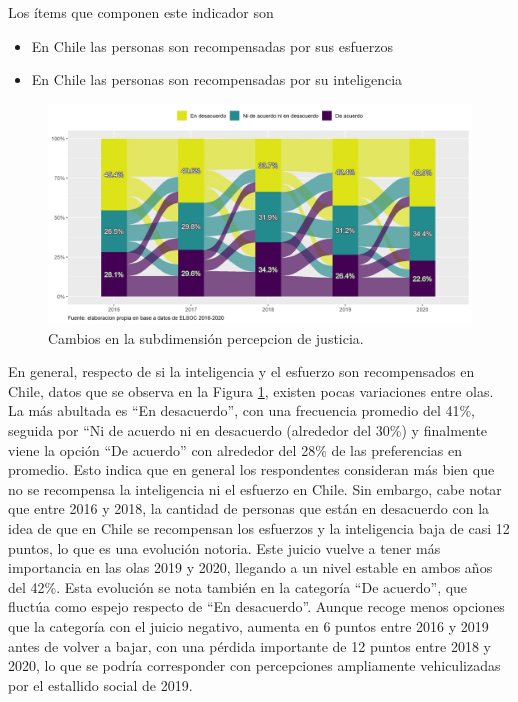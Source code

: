 \documentclass[
  12pt,
]{book}
\begin{document}
Los ítems que componen este indicador son

\begin{itemize}
\item
  En Chile las personas son recompensadas por sus esfuerzos
\item
  En Chile las personas son recompensadas por su inteligencia
\end{itemize}

\begin{figure}[H]

{\centering \includegraphics[width=1\linewidth,height=1\textheight]{output/graphs/alluvial_justicia} 

}

\caption{Cambios en la subdimensión percepcion de justicia.}\label{fig:alluvial-justicia}
\end{figure}

En general, respecto de si la inteligencia y el esfuerzo son recompensados en Chile, datos que se observa en la Figura \ref{fig:alluvial-justicia}, existen pocas variaciones entre olas. La más abultada es ``En desacuerdo'', con una frecuencia promedio del 41\%, seguida por ``Ni de acuerdo ni en desacuerdo (alrededor del 30\%) y finalmente viene la opción ``De acuerdo'' con alrededor del 28\% de las preferencias en promedio. Esto indica que en general los respondentes consideran más bien que no se recompensa la inteligencia ni el esfuerzo en Chile. Sin embargo, cabe notar que entre 2016 y 2018, la cantidad de personas que están en desacuerdo con la idea de que en Chile se recompensan los esfuerzos y la inteligencia baja de casi 12 puntos, lo que es una evolución notoria. Este juicio vuelve a tener más importancia en las olas 2019 y 2020, llegando a un nivel estable en ambos años del 42\%. Esta evolución se nota también en la categoría ``De acuerdo'', que fluctúa como espejo respecto de ``En desacuerdo''. Aunque recoge menos opciones que la categoría con el juicio negativo, aumenta en 6 puntos entre 2016 y 2019 antes de volver a bajar, con una pérdida importante de 12 puntos entre 2018 y 2020, lo que se podría corresponder con percepciones ampliamente vehiculizadas por el estallido social de 2019.
\end{document}
